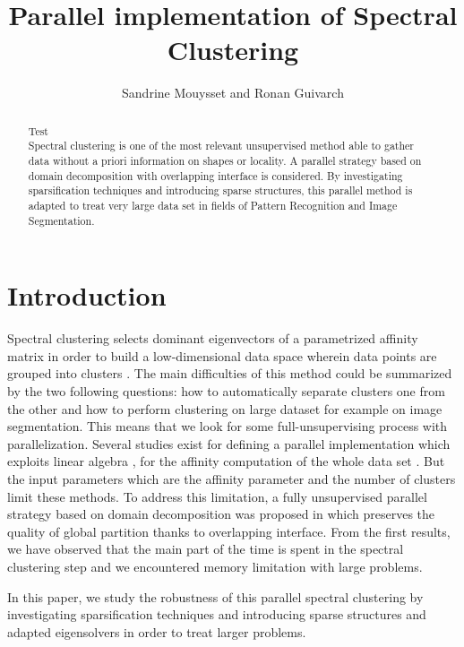 \documentclass{llncs}
\begin{document}
\title{Parallel implementation of Spectral Clustering}

\author{Sandrine Mouysset and Ronan Guivarch}


\maketitle

\begin{abstract}
Test \\
Spectral clustering is one of the most relevant unsupervised method able to
gather data without a priori information on shapes or locality. A parallel
strategy based on domain decomposition with overlapping interface is
considered. By investigating  sparsification techniques and introducing sparse
structures, this parallel method is  adapted to treat very large data set in
fields of Pattern Recognition and Image Segmentation.
\end{abstract}
%
\section{Introduction}
%
Spectral clustering selects dominant eigenvectors of a parametrized affinity
matrix in order to build a low-dimensional data space wherein data points are
grouped into clusters \cite{speC}. The main difficulties of this method could be
summarized by
the two following questions: how to automatically separate clusters one from
the other and how to perform clustering on large dataset for example on image
segmentation. This means that we look for some full-unsupervising process with
parallelization.
Several studies exist for defining a parallel implementation which exploits linear
algebra \cite{song}, \cite{fowlkes} for the affinity computation of the whole data set
\cite{Chen10}. But the input parameters which are the affinity parameter and
the number of clusters limit these methods.
To address this limitation, a fully unsupervised parallel strategy based on
domain decomposition was proposed in \cite{mouysset3} which preserves the
quality of global partition thanks to overlapping interface. From the first
results, we have observed that the main part of the time is spent in the
spectral clustering step and we encountered memory limitation with large
problems.

In this paper, we study the robustness of this parallel spectral clustering by
investigating sparsification techniques and introducing sparse structures and
adapted eigensolvers in order to treat larger problems.
\end{document}
